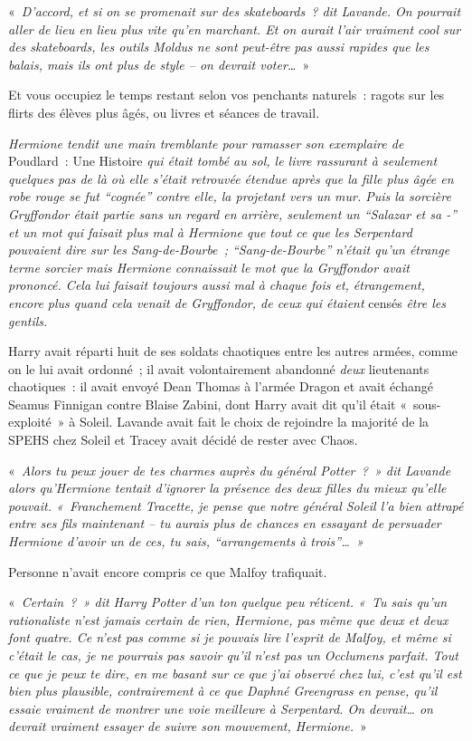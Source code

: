 «~\emph{D'accord, et si on se promenait sur des skateboards~? dit Lavande. On pourrait aller de lieu en lieu plus vite qu'en marchant. Et on aurait l'air vraiment cool sur des skateboards, les outils Moldus ne sont peut-être pas aussi rapides que les balais, mais ils ont plus de style -- on devrait voter…}~»

Et vous occupiez le temps restant selon vos penchants naturels~: ragots sur les flirts des élèves plus âgés, ou livres et séances de travail.

\emph{Hermione tendit une main tremblante pour ramasser son exemplaire de} Poudlard~: Une Histoire \emph{qui était tombé au sol, le livre rassurant à seulement quelques pas de là où elle s'était retrouvée étendue après que la fille plus âgée en robe rouge se fut “cognée” contre elle, la projetant vers un mur. Puis la sorcière Gryffondor était partie sans un regard en arrière, seulement un “Salazar et sa -” et un mot qui faisait plus mal à Hermione que tout ce que les Serpentard pouvaient dire sur les Sang-de-Bourbe~; “Sang-de-Bourbe” n'était qu'un étrange terme sorcier mais Hermione connaissait le mot que la Gryffondor avait prononcé. Cela lui faisait toujours aussi mal à chaque fois et, étrangement, encore plus quand cela venait de Gryffondor, de ceux qui étaient} censés \emph{être les gentils.}

Harry avait réparti huit de ses soldats chaotiques entre les autres armées, comme on le lui avait ordonné~; il avait volontairement abandonné \emph{deux} lieutenants chaotiques~: il avait envoyé Dean Thomas à l'armée Dragon et avait échangé Seamus Finnigan contre Blaise Zabini, dont Harry avait dit qu'il était «~sous-exploité~» à Soleil. Lavande avait fait le choix de rejoindre la majorité de la SPEHS chez Soleil et Tracey avait décidé de rester avec Chaos.

«~\emph{Alors tu peux jouer de tes charmes auprès du général Potter~?~» dit Lavande alors qu'Hermione tentait d'ignorer la présence des deux filles du mieux qu'elle pouvait. «~Franchement Tracette, je pense que notre général Soleil l'a bien attrapé entre ses fils maintenant -- tu aurais plus de chances en essayant de persuader Hermione d'avoir un de ces, tu sais, “arrangements à trois”…~»}

Personne n'avait encore compris ce que Malfoy trafiquait.

«~\emph{Certain~?~» dit Harry Potter d'un ton quelque peu réticent. «~Tu sais qu'un rationaliste n'est jamais certain de rien, Hermione, pas même que deux et deux font quatre. Ce n'est pas comme si je pouvais lire l'esprit de Malfoy, et même si c'était le cas, je ne pourrais pas savoir qu'il n'est pas un Occlumens parfait. Tout ce que je peux te dire, en me basant sur ce que j'ai observé chez lui, c'est qu'il est bien plus plausible, contrairement à ce que Daphné Greengrass en pense, qu'il essaie vraiment de montrer une voie meilleure à Serpentard. On devrait… on devrait vraiment essayer de suivre son mouvement, Hermione.}~»

